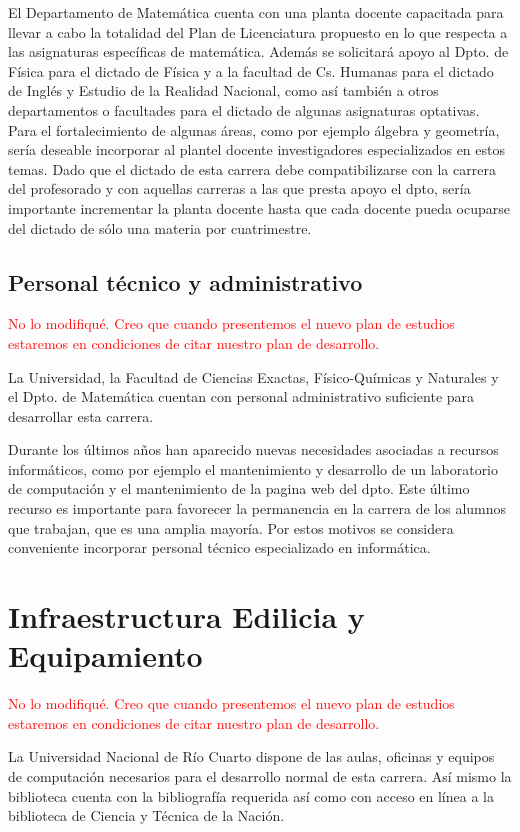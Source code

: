\documentclass[a4paper, 12pt]{article}
\begin{document}
El Departamento de Matemática cuenta con una planta docente
capacitada para llevar a cabo la totalidad del Plan de
Licenciatura propuesto en lo que  respecta a las
asignaturas específicas de matemática. Además se solicitará apoyo
al Dpto. de Física para el dictado de Física y a la facultad de
Cs. Humanas para el dictado de Inglés y Estudio de la Realidad Nacional,
como así también a otros departamentos o facultades para el
dictado de algunas asignaturas optativas. Para el fortalecimiento
de algunas áreas, como por ejemplo álgebra y geometría, sería
deseable incorporar al plantel  docente investigadores
especializados en estos temas. Dado que el  dictado de esta
carrera debe compatibilizarse con la carrera del profesorado y con
aquellas carreras a las  que presta apoyo el dpto, sería
importante incrementar la planta docente hasta que cada docente
pueda ocuparse del dictado de sólo una materia por cuatrimestre.

\subsection{Personal técnico y administrativo}
\textcolor{red}{No lo modifiqué. Creo que cuando presentemos el nuevo plan de estudios estaremos en condiciones de citar nuestro plan de desarrollo.}

La Universidad, la Facultad de Ciencias Exactas, Físico-Químicas y
Naturales y el Dpto. de Matemática cuentan con personal
administrativo suficiente para desarrollar esta carrera.

Durante los últimos años han aparecido nuevas necesidades
asociadas a recursos informáticos, como por ejemplo el
mantenimiento y desarrollo de un laboratorio de computación y el
mantenimiento  de la pagina web del dpto. Este último recurso es
importante para favorecer la permanencia en la carrera de los
alumnos que trabajan, que es una amplia mayoría. Por estos
motivos se considera conveniente incorporar personal técnico
especializado en informática.


\section{Infraestructura Edilicia y Equipamiento}
\textcolor{red}{No lo modifiqué. Creo que cuando presentemos el nuevo plan de estudios estaremos en condiciones de citar nuestro plan de desarrollo.}

 La Universidad
Nacional de Río Cuarto dispone de las aulas, oficinas y equipos de
computación necesarios para el desarrollo normal de esta carrera.
Así mismo la biblioteca cuenta con la bibliografía requerida así
como con acceso en línea   a la biblioteca de Ciencia y Técnica de
la Nación.
\end{document}
